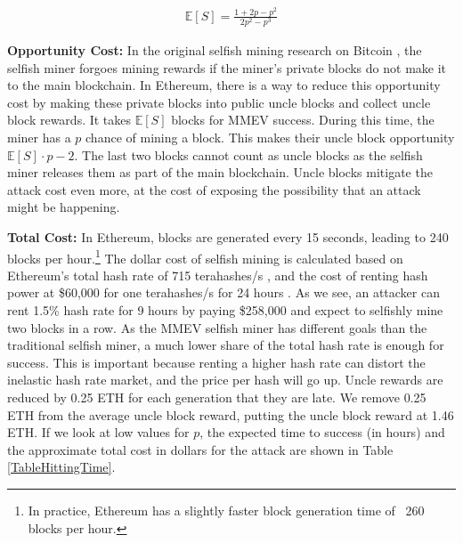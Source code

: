 \documentclass[conference]{IEEEtran}
\begin{document}
\begin{align*}
    \mathbb{E}[S] = \frac{1 + 2p - p^2}{2p^2 - p^3}
\end{align*}

\noindent
\textbf{Opportunity Cost:} In the original selfish mining research on Bitcoin \cite{eyal2014majority}, the selfish miner forgoes mining rewards if the miner's private blocks do not make it to the main blockchain. In Ethereum, there is a way to reduce this opportunity cost by making these private blocks into public uncle blocks and collect uncle block rewards. It takes $\mathbb{E}[S]$ blocks for MMEV success. During this time, the miner has a $p$ chance of mining a block. This makes their uncle block opportunity $\mathbb{E}[S] \cdot p - 2$. The last two blocks cannot count as uncle blocks as the selfish miner releases them as part of the main blockchain. Uncle blocks mitigate the attack cost even more, at the cost of exposing the possibility that an attack might be happening.

\textbf{Total Cost:} In Ethereum, blocks are generated every 15 seconds, leading to 240 blocks per hour.\footnote{In practice, Ethereum has a slightly faster block generation time of ~260 blocks per hour.} The dollar cost of selfish mining is calculated based on Ethereum's total hash rate of 715 terahashes/s \cite{ethereum_hash_rate}, and the cost of renting hash power at \$60,000 for one terahashes/s for 24 hours \cite{nicehash}. As we see, an attacker can rent 1.5\% hash rate for 9 hours by paying \$258,000 and expect to selfishly mine two blocks in a row. As the MMEV selfish miner has different goals than the traditional selfish miner, a much lower share of the total hash rate is enough for success. This is important because renting a higher hash rate can distort the inelastic hash rate market, and the price per hash will go up. Uncle rewards are reduced by 0.25 ETH for each generation that they are late. We remove 0.25 ETH from the average uncle block reward, putting the uncle block reward at 1.46 ETH. If we look at low values for $p$, the expected time to success (in hours) and the approximate total cost in dollars for the attack are shown in Table \ref{TableHittingTime}.
\break
\end{document}
